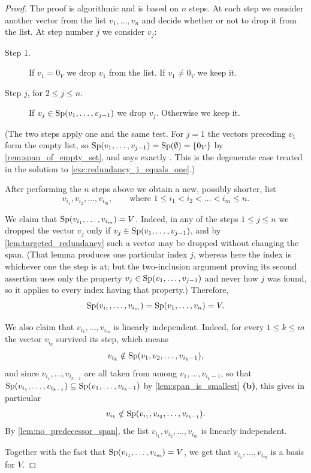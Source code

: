 \begin{proof}
The proof is algorithmic and is based on $n$ steps. At each step we consider another vector from the list $v_1, \dots, v_n$ and decide whether or not to drop it from the list. At step number $j$ we consider $v_j$:

\begin{description}
    \item[Step 1.] If $v_1 = 0_V$ we drop $v_1$ from the list. If $v_1 \ne 0_V$ we keep it.
    \item[Step $j$, for $2 \le j \le n$.] If $v_j \in \operatorname{Sp}(v_1, \dots, v_{j-1})$ we drop $v_j$. Otherwise we keep it.
\end{description}

(The two steps apply one and the same test. For $j = 1$ the vectors preceding $v_1$ form the empty list, so $\operatorname{Sp}(v_1, \dots, v_{j-1}) = \operatorname{Sp}(\emptyset) = \{0_V\}$ by \cref{rem:span_of_empty_set}, and  says exactly . This is the degenerate case treated in the solution to \cref{exc:redundancy_j_equals_one}.)

After performing the $n$ steps above we obtain a new, possibly shorter, list
\[
v_{i_1}, v_{i_2}, \dots, v_{i_m}, \qquad \text{where } 1 \le i_1 < i_2 < \dots < i_m \le n.
\]

We claim that $\operatorname{Sp}(v_{i_1}, \dots, v_{i_m}) = V$. Indeed, in any of the steps $1 \le j \le n$ we dropped the vector $v_j$ only if $v_j \in \operatorname{Sp}(v_1, \dots, v_{j-1})$, and by \cref{lem:targeted_redundancy} such a vector may be dropped without changing the span. (That lemma produces one particular index $j$, whereas here the index is whichever one the step is at; but the two-inclusion argument proving its second assertion uses only the property $v_j \in \operatorname{Sp}(v_1, \dots, v_{j-1})$ and never how $j$ was found, so it applies to every index having that property.) Therefore,
\[
\operatorname{Sp}(v_{i_1}, \dots, v_{i_m}) = \operatorname{Sp}(v_1, \dots, v_n) = V.
\]

We also claim that $v_{i_1}, \dots, v_{i_m}$ is linearly independent. Indeed, for every $1 \le k \le m$ the vector $v_{i_k}$ survived its step, which means
\[
v_{i_k} \notin \operatorname{Sp}(v_1, v_2, \dots, v_{i_k - 1}),
\]
and since $v_{i_1}, \dots, v_{i_{k-1}}$ are all taken from among $v_1, \dots, v_{i_k - 1}$, so that $\operatorname{Sp}(v_{i_1}, \dots, v_{i_{k-1}}) \subseteq \operatorname{Sp}(v_1, \dots, v_{i_k - 1})$ by \cref{lem:span_is_smallest} \textbf{(b)}, this gives in particular
\[
v_{i_k} \notin \operatorname{Sp}(v_{i_1}, v_{i_2}, \dots, v_{i_{k-1}}).
\]
By \cref{lem:no_predecessor_span}, the list $v_{i_1}, v_{i_2}, \dots, v_{i_m}$ is linearly independent.

Together with the fact that $\operatorname{Sp}(v_{i_1}, \dots, v_{i_m}) = V$, we get that $v_{i_1}, \dots, v_{i_m}$ is a basis for $V$.
\end{proof}

